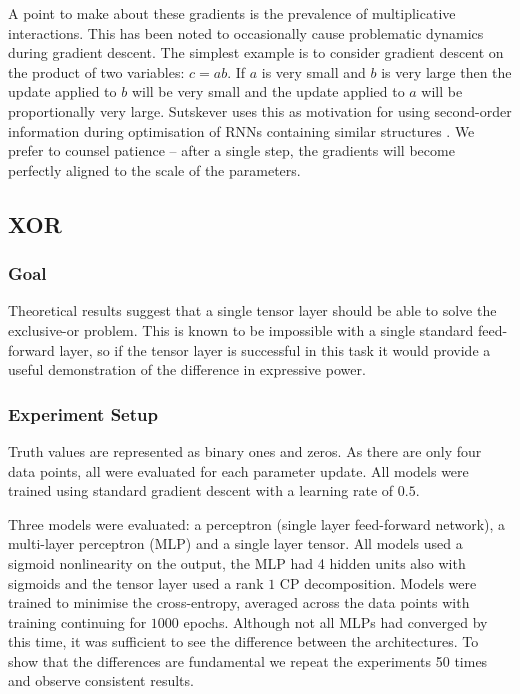 A point to make about these gradients is the prevalence of multiplicative interactions.
This has been noted to occasionally cause problematic dynamics during gradient descent. The
simplest example is to consider
gradient descent on the product of two variables: \(c = ab\). If \(a\) is very small and \(b\) is
very large then the update applied to \(b\) will be very small and the update applied to \(a\) will
be proportionally very large. Sutskever uses this as motivation for using
second-order information during optimisation of RNNs containing similar 
structures \autocite{Sutskever2013}. We prefer to
counsel patience -- after a single step, the gradients will become perfectly aligned to the scale
of the parameters.


\subsection{XOR}
\subsubsection{Goal}
Theoretical results suggest that a single tensor layer should be able to solve the exclusive-or problem.
This is known to be impossible with a single standard
feed-forward layer, so if the tensor layer is successful
in this task it would provide a useful demonstration of the difference in expressive power.

\subsubsection{Experiment Setup}
Truth values are represented as binary ones and zeros. 
As there are only four data points, all were evaluated for each parameter update.
All models were trained using standard gradient descent with a learning rate of \(0.5\).

Three models were evaluated: a perceptron (single layer feed-forward network), 
a multi-layer perceptron (MLP) and a single layer tensor. All
models used a sigmoid nonlinearity on the output, the MLP had 4 hidden units also with sigmoids and the 
tensor layer used a rank \(1\) CP decomposition. Models
were trained to minimise the cross-entropy, averaged across the data points with training continuing
for \(1000\) epochs. Although not all MLPs had converged by this time, it was sufficient to see the
difference
between the architectures. To show that the differences are fundamental we repeat the experiments 50
times and observe consistent results.

